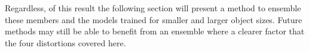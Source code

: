 Regardless, of this result the following section will present a method to ensemble these members and the models trained for smaller and larger object sizes. Future methods may still be able to benefit from an ensemble where a clearer factor that the four distortions covered here.

